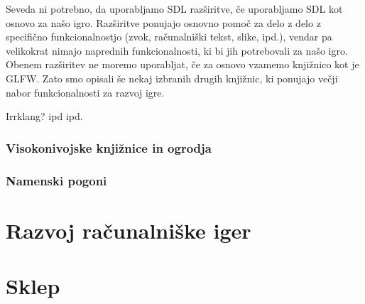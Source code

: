 \documentclass[12pt,a4paper,twoside]{book}
\begin{document}
Seveda ni potrebno, da uporabljamo SDL razširitve, če uporabljamo SDL kot osnovo za našo igro. Razširitve ponujajo osnovno pomoč za delo z delo z specifično funkcionalnostjo (zvok, računalniški tekst, slike, ipd.), vendar pa velikokrat nimajo naprednih funkcionalnosti, ki bi jih potrebovali za našo igro. Obenem razširitev ne moremo uporabljat, če za osnovo vzamemo knjižnico kot je GLFW. Zato smo opisali še nekaj izbranih drugih knjižnic, ki ponujajo večji nabor funkcionalnosti za razvoj igre.

Irrklang?
ipd ipd.

\subsection{Visokonivojske knjižnice in ogrodja}
\subsection{Namenski pogoni}

\chapter{Razvoj računalniške iger}\thispagestyle{fancy}
\label{chapter:razvojIger}

\chapter{Sklep}\thispagestyle{fancy}

\cleardoublepage


\end{document}

